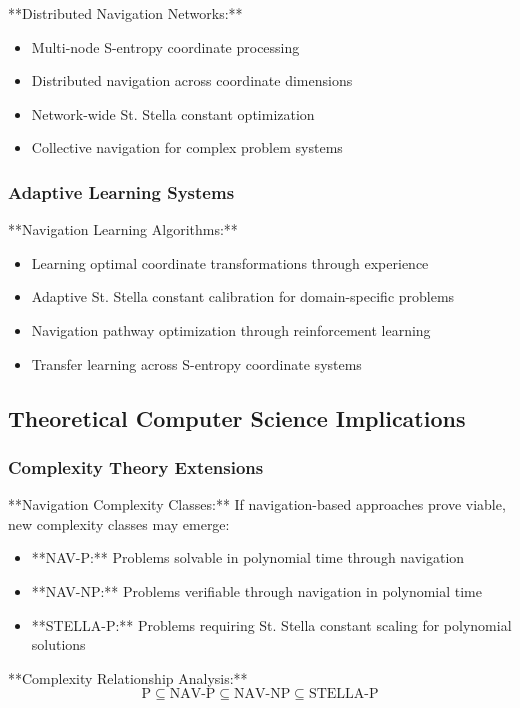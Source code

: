\documentclass[12pt,a4paper]{article}
\begin{document}
**Distributed Navigation Networks:**
\begin{itemize}
\item Multi-node S-entropy coordinate processing
\item Distributed navigation across coordinate dimensions
\item Network-wide St. Stella constant optimization
\item Collective navigation for complex problem systems
\end{itemize}

\subsubsection{Adaptive Learning Systems}

**Navigation Learning Algorithms:**
\begin{itemize}
\item Learning optimal coordinate transformations through experience
\item Adaptive St. Stella constant calibration for domain-specific problems
\item Navigation pathway optimization through reinforcement learning
\item Transfer learning across S-entropy coordinate systems
\end{itemize}

\subsection{Theoretical Computer Science Implications}

\subsubsection{Complexity Theory Extensions}

**Navigation Complexity Classes:**
If navigation-based approaches prove viable, new complexity classes may emerge:
\begin{itemize}
\item **NAV-P:** Problems solvable in polynomial time through navigation
\item **NAV-NP:** Problems verifiable through navigation in polynomial time
\item **STELLA-P:** Problems requiring St. Stella constant scaling for polynomial solutions
\end{itemize}

**Complexity Relationship Analysis:**
\begin{equation}
\text{P} \subseteq \text{NAV-P} \subseteq \text{NAV-NP} \subseteq \text{STELLA-P}
\label{eq:complexity_relationships}
\end{equation}
\end{document}
